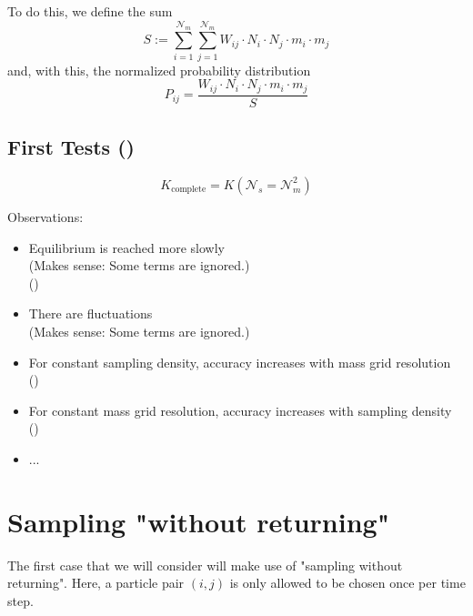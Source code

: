     To do this, we define the sum
    \begin{equation}
        S
            := \sum_{i=1}^{\mathcal N_m} \sum_{j=1}^{\mathcal N_m}
               W_{ij} \cdot N_i \cdot N_j \cdot m_i \cdot m_j
    \end{equation}
    and, with this, the normalized probability distribution
    \begin{equation}
        P_{ij}
            = \frac{W_{ij} \cdot N_i \cdot N_j \cdot m_i \cdot m_j}{S}
    \end{equation}

    \subsection{First Tests ()}

    $$K_\text{complete}=K(\mathcal{N}_s=\mathcal{N}_m^2)$$

    Observations:
    \begin{itemize}
        \item Equilibrium is reached more slowly \\ 
            (Makes sense: Some terms are ignored.) \\
            ()
        \item There are fluctuations \\ 
            (Makes sense: Some terms are ignored.)
        \item For constant sampling density, accuracy increases with mass grid resolution \\
            ()
        \item For constant mass grid resolution, accuracy increases with sampling density \\
            ()
        \item ...
    \end{itemize}

\section{Sampling "without returning"}

    The first case that we will consider will make use of "sampling without returning". Here, a 
    particle pair $(i, j)$ is only allowed to be chosen once per time step.

